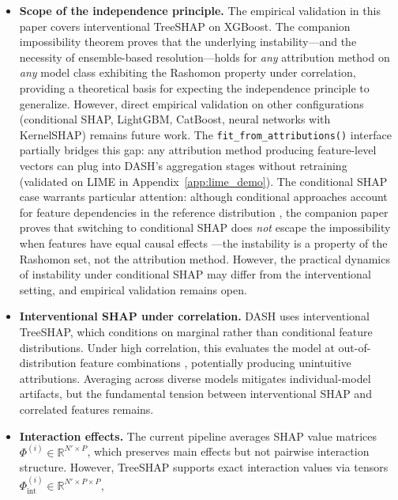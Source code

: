 \documentclass[11pt]{article}
\newcommand{\dash}{\textsc{DASH}}
\begin{document}
\begin{itemize}
  \item \textbf{Scope of the independence principle.} The empirical
    validation in this paper covers interventional TreeSHAP on XGBoost.
    The companion impossibility theorem
    \citep{caraker2026impossibility} proves that the underlying
    instability---and the necessity of ensemble-based resolution---holds
    for \emph{any} attribution method on \emph{any} model class
    exhibiting the Rashomon property under correlation, providing a
    theoretical basis for expecting the independence principle to
    generalize.  However, direct empirical validation on other
    configurations (conditional SHAP, LightGBM, CatBoost, neural
    networks with KernelSHAP) remains future work.  The
    \texttt{fit\_from\_attributions()} interface partially bridges this
    gap: any attribution method producing feature-level vectors can
    plug into \dash{}'s aggregation stages without retraining
    (validated on LIME in Appendix~\ref{app:lime_demo}).
    The conditional SHAP case warrants particular attention: although
    conditional approaches account for feature dependencies in the
    reference distribution \citep{aas2021explaining}, the companion
    paper proves that switching to conditional SHAP does \emph{not}
    escape the impossibility when features have equal causal effects
    \citep{caraker2026impossibility}---the instability is a property of
    the Rashomon set, not the attribution method.  However, the
    practical dynamics of instability under conditional SHAP may differ
    from the interventional setting, and empirical validation remains
    open.
  \item \textbf{Interventional SHAP under correlation.} DASH uses
    interventional TreeSHAP, which conditions on marginal rather than
    conditional feature distributions. Under high correlation, this
    evaluates the model at out-of-distribution feature combinations
    \citep{janzing2020feature, aas2021explaining}, potentially
    producing unintuitive attributions. Averaging across diverse models
    mitigates individual-model artifacts, but the fundamental tension
    between interventional SHAP and correlated features remains.
  \item \textbf{Interaction effects.} The current pipeline averages SHAP
    value matrices $\Phi^{(i)} \in \mathbb{R}^{N' \times P}$, which
    preserves main effects but not pairwise interaction structure.
    However, TreeSHAP supports exact interaction values via tensors
    $\Phi_{\text{int}}^{(i)} \in \mathbb{R}^{N' \times P \times P}$,

\end{itemize}
\end{document}
